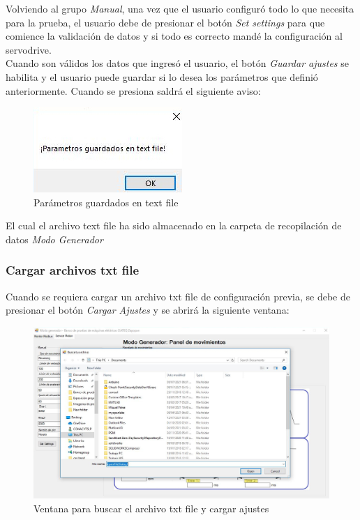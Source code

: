 \documentclass[12pt,titlepage]{article}
\begin{document}
Volviendo al grupo \textit{Manual}, una vez que el usuario configuró todo lo que necesita para la prueba, el usuario debe de presionar el botón \textit{Set settings} para que comience la validación de datos y si todo es correcto mandé la configuración al servodrive.\\

Cuando son válidos los datos que ingresó el usuario, el botón \textit{Guardar ajustes} se habilita y el usuario puede guardar si lo desea los parámetros que definió anteriormente. Cuando se presiona saldrá el siguiente aviso: \\ 

\begin{figure}[htbp]
\hspace*{5.8cm} 
\includegraphics[scale=0.78]{parametros_save}
\caption{Parámetros guardados en text file}
\end{figure}

El cual el archivo text file ha sido almacenado en la carpeta de recopilación de datos \textit{Modo Generador}
\newpage
\subsubsection{Cargar archivos txt file}
Cuando se requiera cargar un archivo txt file de configuración previa, se debe de presionar el botón \textit{Cargar Ajustes} y se abrirá la siguiente ventana: \\ 

\begin{figure}[htbp]
\hspace*{1.2cm} 
\includegraphics[scale=0.48]{buscar_archivo}
\caption{Ventana para buscar el archivo txt file y cargar ajustes}
\end{figure}
\end{document}
